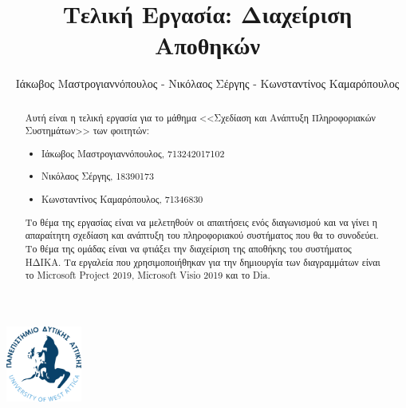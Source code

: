 \documentclass[
    11pt,
    singlespacing,
    liststotoc,
    toctotoc,
    headspline
]{fphw}
\title{Τελική Εργασία: Διαχείριση Αποθηκών}
\author{Ιάκωβος Μαστρογιαννόπουλος - Νικόλαος Σέργης - Κωνσταντίνος Καμαρόπουλος}
\institute{Πανεπιστημιο Δυτικης Αττικης \\ Τμημα Μηχανικων Πληροφορικης και Υπολογιστων}
\begin{document}
\includegraphics[width=25mm]{Figures/Logo}
\maketitle

\begin{abstract}
  Αυτή είναι η τελική εργασία για το μάθημα <<Σχεδίαση και Ανάπτυξη Πληροφοριακών Συστημάτων>> των φοιτητών:
  \begin{itemize}
      \item Ιάκωβος Μαστρογιαννόπουλος, 713242017102
      \item Νικόλαος Σέργης, 18390173
      \item Κωνσταντίνος Καμαρόπουλος, 71346830
  \end{itemize}

  Το θέμα της εργασίας είναι να μελετηθούν οι απαιτήσεις ενός διαγωνισμού και να γίνει η απαραίτητη σχεδίαση και ανάπτυξη του πληροφοριακού συστήματος
  που θα το συνοδεύει. Το θέμα της ομάδας είναι να φτιάξει την διαχείριση της αποθήκης του συστήματος ΗΔΙΚΑ. Τα εργαλεία που χρησιμοποιήθηκαν για την δημιουργία των διαγραμμάτων είναι το Microsoft Project 2019, Microsoft Visio 2019 και το Dia.
\end{abstract}

\newpage
\tableofcontents
\listoffigures
\listoftables

\newpage


\end{document}
